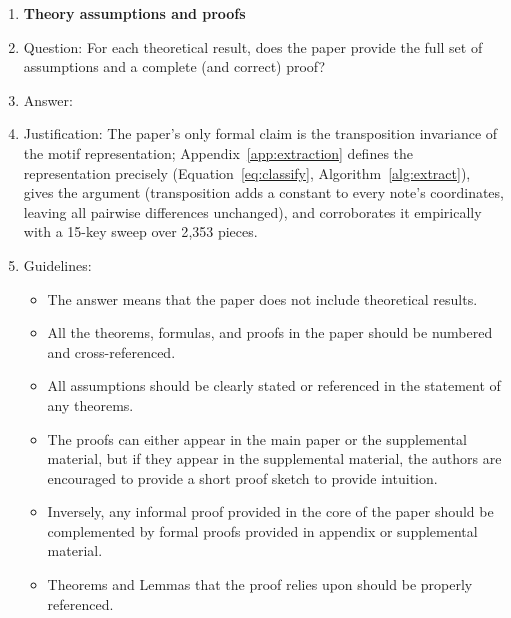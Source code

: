 \documentclass{article}
\begin{document}
\begin{enumerate}
\begin{itemize}
        \item While the authors might fear that complete honesty about limitations might be used by reviewers as grounds for rejection, a worse outcome might be that reviewers discover limitations that aren't acknowledged in the paper. The authors should use their best judgment and recognize that individual actions in favor of transparency play an important role in developing norms that preserve the integrity of the community. Reviewers will be specifically instructed to not penalize honesty concerning limitations.
    \end{itemize}

\item {\bf Theory assumptions and proofs}
    \item[] Question: For each theoretical result, does the paper provide the full set of assumptions and a complete (and correct) proof?
    \item[] Answer: \answerYes{}
    \item[] Justification: The paper's only formal claim is the transposition invariance of the motif representation; Appendix~\ref{app:extraction} defines the representation precisely (Equation~\ref{eq:classify}, Algorithm~\ref{alg:extract}), gives the argument (transposition adds a constant to every note's coordinates, leaving all pairwise differences unchanged), and corroborates it empirically with a 15-key sweep over 2{,}353 pieces.
    \item[] Guidelines:
    \begin{itemize}
        \item The answer \answerNA{} means that the paper does not include theoretical results. 
        \item All the theorems, formulas, and proofs in the paper should be numbered and cross-referenced.
        \item All assumptions should be clearly stated or referenced in the statement of any theorems.
        \item The proofs can either appear in the main paper or the supplemental material, but if they appear in the supplemental material, the authors are encouraged to provide a short proof sketch to provide intuition. 
        \item Inversely, any informal proof provided in the core of the paper should be complemented by formal proofs provided in appendix or supplemental material.
        \item Theorems and Lemmas that the proof relies upon should be properly referenced. 
    \end{itemize}


\end{enumerate}
\end{document}
